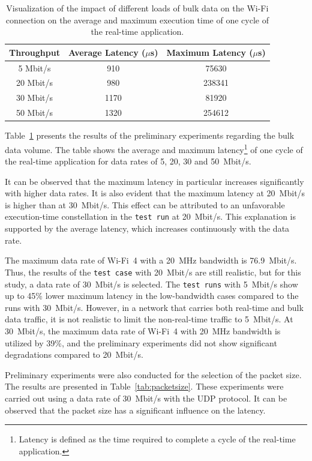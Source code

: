\begin{table}
\begin{tabular}{||c|c|c||}
\hline\hline
\textbf{Throughput} & \textbf{Average Latency ($\mu$s)} & \textbf{Maximum Latency ($\mu$s)} \\
\hline\hline
5 Mbit/s & 910 & 75630 \\
\hline
20 Mbit/s & 980 & 238341 \\
\hline
30 Mbit/s & 1170 & 81920 \\
\hline
50 Mbit/s & 1320 & 254612 \\
\hline\hline
\end{tabular}
\caption{Visualization of the impact of different loads of bulk data on the Wi-Fi connection on the average and maximum execution time of one cycle of the real-time application.}
\label{tab:throughput}
\end{table}

Table~\ref{tab:throughput} presents the results of the preliminary experiments regarding the bulk data volume.  
The table shows the average and maximum latency\footnote{Latency is defined as the time required to complete a cycle of the real-time application.} of one cycle of the real-time application for data rates of 5, 20, 30 and 50~Mbit/s.  

It can be observed that the maximum latency in particular increases significantly with higher data rates.  
It is also evident that the maximum latency at 20~Mbit/s is higher than at 30~Mbit/s.  
This effect can be attributed to an unfavorable execution-time constellation in the \texttt{test run} at 20~Mbit/s.  
This explanation is supported by the average latency, which increases continuously with the data rate.  

The maximum data rate of Wi-Fi~4 with a 20~MHz bandwidth is 76.9~Mbit/s.  
Thus, the results of the \texttt{test case} with 20~Mbit/s are still realistic, but for this study, a data rate of 30~Mbit/s is selected.  
The \texttt{test runs} with 5~Mbit/s show up to 45\% lower maximum latency in the low-bandwidth cases compared to the runs with 30~Mbit/s.  
However, in a network that carries both real-time and bulk data traffic, it is not realistic to limit the non-real-time traffic to 5~Mbit/s.  
At 30~Mbit/s, the maximum data rate of Wi-Fi~4 with 20~MHz bandwidth is utilized by 39\%, and the preliminary experiments did not show significant degradations compared to 20~Mbit/s.  

Preliminary experiments were also conducted for the selection of the packet size.  
The results are presented in Table~\ref{tab:packetsize}.  
These experiments were carried out using a data rate of 30~Mbit/s with the \ac{UDP} protocol.  
It can be observed that the packet size has a significant influence on the latency.  

